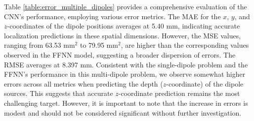 \documentclass[a4paper, UKenglish, 11pt]{uiomaster}
\begin{document}
Table \ref{table:error_multiple_dipoles} provides a comprehensive evaluation of the CNN's performance, employing various error metrics. The MAE for the $x$, $y$, and $z$-coordinates of the dipole positions averages at 5.40 mm, indicating accurate localization predictions in these spatial dimensions. However, the MSE values, ranging from 63.53 mm$^2$ to 79.95 mm$^2$, are higher than the corresponding values observed in the FFNN model, suggesting a broader dispersion of errors. The RMSE averages at 8.397 mm. Consistent with the single-dipole problem and the FFNN's performance in this multi-dipole problem, we observe somewhat higher errors across all metrics when predicting the depth ($z$-coordinate) of the dipole sources. This suggests that accurate $z$-coordinate prediction remains the most challenging target. However, it is important to note that the increase in errors is modest and should not be considered significant without further investigation.
\end{document}
